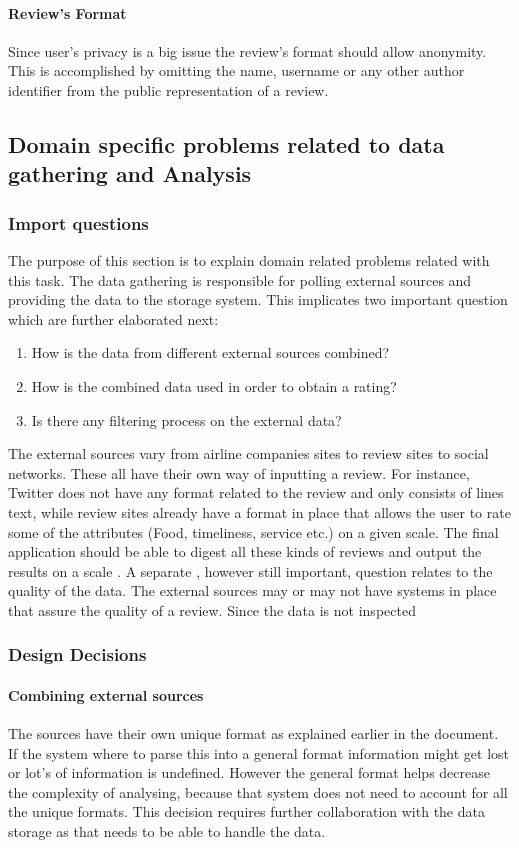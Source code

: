 \documentclass{article}
\begin{document}
\paragraph{Review's Format} Since user's privacy is a big issue the review's format should allow anonymity. This is accomplished by omitting the name, username or any other author 
identifier from the public representation of a review.

\subsection{Domain specific problems related to data gathering and Analysis}
\subsubsection{Import questions}
The purpose of this section is to explain domain related problems related with this task. The data gathering is responsible for polling external sources and providing the data to the storage system. This implicates two important question which are further elaborated next:
\begin{enumerate}
\item	How is the data from different external sources combined?
\item	How is the combined data used in order to obtain a rating?
\item	Is there any filtering process on the external data?
\end{enumerate}
The external sources vary from airline companies sites to review sites to social networks. These all have their own way of inputting a review. For instance, Twitter does not have any format related to the review and only consists of lines text, while review sites already have  a format in place that allows the user to rate some of the attributes (Food, timeliness, service etc.) on a given scale. The final application should be able to digest all these kinds of reviews and output the results on a scale . 
A separate , however still important, question relates to the quality of the data. The external sources may or may not have systems in place that assure the quality of a review. Since the data is not inspected 

\subsubsection{Design Decisions}

\paragraph{Combining external sources}
The sources have their own unique format as explained earlier in the document. If the system where to parse this into a general format information might get lost or lot's of information is undefined.
However the general format helps decrease the complexity of analysing, because that system does not need to account for all the unique formats. This decision requires further collaboration with the data storage
as that needs to be able to handle the data. 
\end{document}
